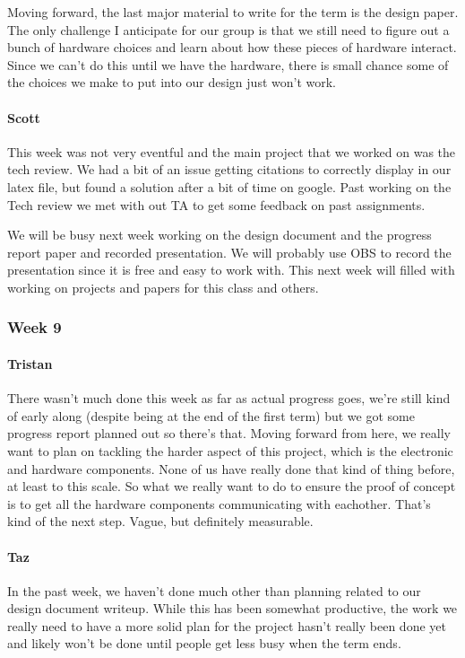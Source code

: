 \documentclass[onecolumn, draftclsnofoot,10pt, compsoc]{IEEEtran}
\begin{document}
Moving forward, the last major material to write for the term is the design paper. The only challenge I anticipate for our group is that we still need to figure out a bunch of hardware choices and learn about how these pieces of hardware interact. Since we can't do this until we have the hardware, there is small chance some of the choices we make to put into our design just won't work.
\paragraph{Scott}
This week was not very eventful and the main project that we worked on was the tech review. We had a bit of an issue getting citations to correctly display in our latex file, but found a solution after a bit of time on google. Past working on the Tech review we met with out TA to get some feedback on past assignments.

We will be busy next week working on the design document and the progress report paper and recorded presentation. We will probably use OBS to record the presentation since it is free and easy to work with. This next week will filled with working on projects and papers for this class and others.
\subsubsection{Week 9}
\paragraph{Tristan}
There wasn't much done this week as far as actual progress goes, we're still kind of early along (despite being at the end of the first term) but we got some progress report planned out so there's that. Moving forward from here, we really want to plan on tackling the harder aspect of this project, which is the electronic and hardware components. None of us have really done that kind of thing before, at least to this scale. So what we really want to do to ensure the proof of concept is to get all the hardware components communicating with eachother. That's kind of the next step. Vague, but definitely measurable.

\paragraph{Taz}
In the past week, we haven't done much other than planning related to our design document writeup. While this has been somewhat productive, the work we really need to have a more solid plan for the project hasn't really been done yet and likely won't be done until people get less busy when the term ends.
\end{document}

